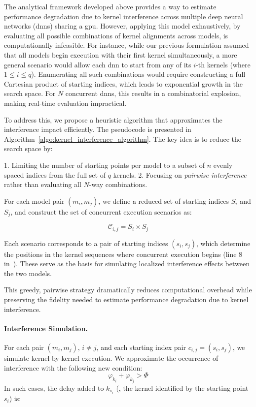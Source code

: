 The analytical framework developed above provides a way to estimate performance degradation due to kernel interference across multiple deep neural networks (\acrshort{dnn}s) sharing a \acrshort{gpu}. However, applying this model exhaustively, by evaluating all possible combinations of kernel alignments across models, is computationally infeasible. For instance, while our previous formulation assumed that all models begin execution with their first kernel simultaneously, a more general scenario would allow each \acrshort{dnn} to start from any of its $i$-th kernels (where $1 \leq i \leq q$). Enumerating all such combinations would require constructing a full Cartesian product of starting indices, which leads to exponential growth in the search space. For $N$ concurrent \acrshort{dnn}s, this results in a combinatorial explosion, making real-time evaluation impractical.

To address this, we propose a heuristic algorithm that approximates the interference impact efficiently. The pseudocode is presented in Algorithm~\cref{algo:kernel_interference_algorithm}. The key idea is to reduce the search space by:

1. Limiting the number of starting points per model to a subset of $n$ evenly spaced indices from the full set of $q$ kernels.
2. Focusing on \textit{pairwise interference} rather than evaluating all $N$-way combinations.

For each model pair $(m_i, m_j)$, we define a reduced set of starting indices $S_i$ and $S_j$, and construct the set of concurrent execution scenarios as:

\begin{equation*}
	\mathcal{C}_{i,j} = S_i \times S_j
\end{equation*}

Each scenario corresponds to a pair of starting indices $(s_i, s_j)$, which determine the positions in the kernel sequences where concurrent execution begins (line 8 in~). These serve as the basis for simulating localized interference effects between the two models.

This greedy, pairwise strategy dramatically reduces computational overhead while preserving the fidelity needed to estimate performance degradation due to kernel interference.

\paragraph{Interference Simulation.} For each pair $(m_i, m_j)$, $i \neq j$, and each starting index pair $c_{i,j}=(s_i, s_j)$, we simulate kernel-by-kernel execution. We approximate the occurrence of interference with the following new condition:
\begin{equation}
	\varphi_{k_i} + \varphi_{k_j} > \Phi
\end{equation}
In such cases, the delay added to $k_{s_i}$ (\ie, the kernel identified by the starting point $s_i$) is:

